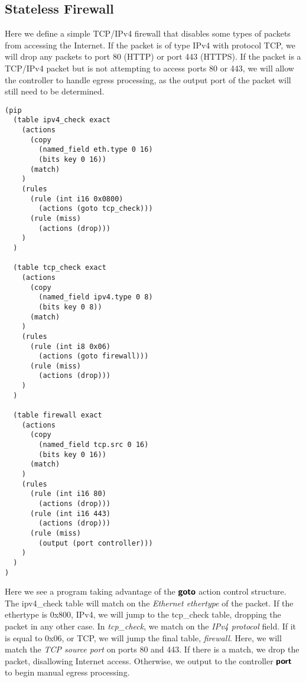 \subsection{Stateless Firewall}
Here we define a simple TCP/IPv4 firewall that disables some types of packets from accessing the Internet. If the packet is of type IPv4 with protocol TCP, we will drop any packets to port 80 (HTTP) or port 443 (HTTPS). If the packet is a TCP/IPv4 packet but is not attempting to access ports 80 or 443, we will allow the controller to handle egress processing, as the output port of the packet will still need to be determined.
\begin{verbatim}
(pip
  (table ipv4_check exact
    (actions
      (copy 
        (named_field eth.type 0 16)
        (bits key 0 16))
      (match)
    )
    (rules
      (rule (int i16 0x0800)
        (actions (goto tcp_check)))
      (rule (miss)
        (actions (drop)))
    )
  )

  (table tcp_check exact
    (actions
      (copy 
        (named_field ipv4.type 0 8)
        (bits key 0 8))
      (match)
    )
    (rules
      (rule (int i8 0x06)
        (actions (goto firewall)))
      (rule (miss)
        (actions (drop)))
    )
  )

  (table firewall exact
    (actions
      (copy
        (named_field tcp.src 0 16)
        (bits key 0 16))
      (match)
    )
    (rules
      (rule (int i16 80)
        (actions (drop)))
      (rule (int i16 443)
        (actions (drop)))
      (rule (miss)
        (output (port controller)))
    )
  )
)
\end{verbatim}

Here we see a program taking advantage of the $\bm{\mathsf{{goto}}}$ action control structure. The ipv4\_check table will match on the \textit{Ethernet ethertype} of the packet. If the ethertype is 0x800, IPv4, we will jump to the tcp\_check table, dropping the packet in any other case. In \textit{tcp\_check}, we match on the \textit{IPv4 protocol} field. If it is equal to 0x06, or TCP, we will jump the final table, \textit{firewall}. Here, we will match the \textit{TCP source port} on ports 80 and 443. If there is a match, we drop the packet, disallowing Internet access. Otherwise, we output to the controller $\bm{\mathsf{{port}}}$ to begin manual egress processing.
